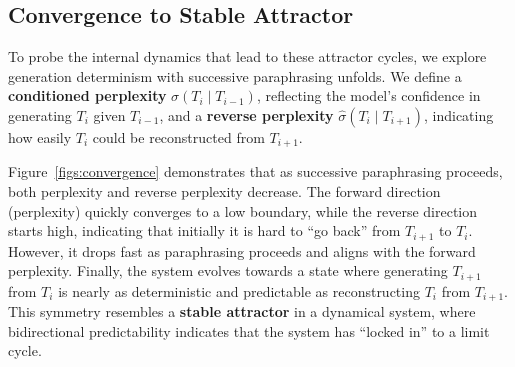




\subsection{Convergence to Stable Attractor}
\label{sec:Convergence}

To probe the internal dynamics that lead to these attractor cycles, we explore generation determinism with successive paraphrasing unfolds.
We define a \textbf{conditioned perplexity} $\sigma(T_i \mid T_{i-1})$, reflecting the model’s confidence in generating $T_i$ given $T_{i-1}$, and a \textbf{reverse perplexity} $\hat{\sigma}(T_i \mid T_{i+1})$, indicating how easily $T_i$ could be reconstructed from $T_{i+1}$.

Figure~\ref{figs:convergence} demonstrates that as successive paraphrasing proceeds, both perplexity and reverse perplexity decrease. 
The forward direction (perplexity) quickly converges to a low boundary, while the reverse direction starts high, indicating that initially it is hard to ``go back'' from $T_{i+1}$ to $T_i$.
However, it drops fast as paraphrasing proceeds and aligns with the forward perplexity. 
Finally, the system evolves towards a state where generating $T_{i+1}$ from $T_i$ is nearly as deterministic and predictable as reconstructing $T_i$ from $T_{i+1}$.
This symmetry resembles a \textbf{stable attractor} in a dynamical system, where bidirectional predictability indicates that the system has ``locked in'' to a limit cycle.

